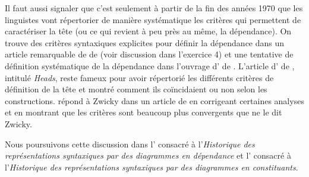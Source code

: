 {    Il faut aussi signaler que c’est seulement à partir de la fin des années 1970 que les linguistes vont répertorier de manière systématique les critères qui permettent de caractériser la tête (ou ce qui revient à peu près au même, la dépendance). On trouve des critères syntaxiques explicites pour définir la dépendance dans un article remarquable de  de \citeyear{garde1977ordre} (voir discussion dans l’exercice 4) et une tentative de définition systématique de la dépendance dans l’ouvrage d’ de \citeyear{melcuk1988dependency}. L’article d’ de \citeyear{zwicky1985heads}, intitulé \textit{Heads}, reste fameux pour avoir répertorié les différents critères de définition de la tête et montré comment ils coïncidaient ou non selon les constructions.  répond à Zwicky dans un article de \citeyear{hudson1987zwicky} en corrigeant certaines analyses et en montrant que les critères sont beaucoup plus convergents que ne le dit Zwicky.

    Nous poursuivons cette discussion dans l’ consacré à l’\textit{Historique des représentations syntaxiques par des diagrammes en dépendance} et l’ consacré à l’\textit{Historique des représentations syntaxiques par des diagrammes en constituants}.
}

